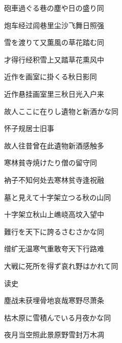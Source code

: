 \begin{haiku}
    {\FH 砲車過ぐる巷の塵や日の盛り}\hfill{\FH 同}

    {\FK 炮车经过闾巷里尘沙飞舞日照强}
\end{haiku}

\begin{haiku}
    {\FH 雪を渡りて又薫風の草花踏む}\hfill{\FH 同}

    {\FK 才得行经积雪上又踏草花熏风中}
\end{haiku}

\begin{haiku}
    {\FH 近作を画室に掛くる秋日影}\hfill{\FH 同}

    {\FK 近作悬挂画室里三秋日光入户来}
\end{haiku}

\begin{haiku}
    {\FH 故人ここに在りし遺物と新酒かな}\hfill{\FH 同}

    {\FK 怀子规居士旧事}

    {\FK 故人往昔曾在此遺物新酒感触多}
\end{haiku}

\begin{haiku}
    {\FH 寒林貧寺焼けたり僧の留守}\hfill{\FH 同}

    {\FK 衲子不知何处去寒林贫寺逢祝融}
\end{haiku}

\begin{haiku}
    {\FH 墓と見えて十字架立つる秋の山}\hfill{\FH 同}

    {\FK 十字架立秋山上嶕峣高坟入望中}
\end{haiku}

\begin{haiku}
    {\FH 難行を天下に誇るさむさかな}\hfill{\FH 同}

    {\FK 缯纩无温寒气重敢夸天下行路难}
\end{haiku}

\begin{haiku}
    {\FH 大戦に死所を得ず哀れ野はかれて}\hfill{\FH 同}

    {\FK 读史}

    {\FK 塵战未获埋骨地哀哉寒野尽萧条}
\end{haiku}

\begin{haiku}
    {\FH 枯木原に雪積んでいる月夜かな}\hfill{\FH 同}

    {\FK 夜月当空照此景原野雪封万木凋}
\end{haiku}

